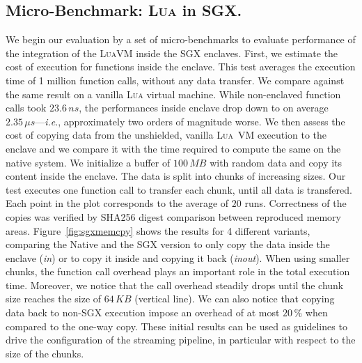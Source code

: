 \subsection{Micro-Benchmark: \textsc{Lua} in SGX.}
We begin our evaluation by a set of micro-benchmarks to evaluate performance of the integration of the \textsc{LuaVM} inside the SGX enclaves.
First, we estimate the cost of execution for functions inside the enclave.
This test averages the execution time of 1 million function calls, without any data transfer.
We compare against the same result on a vanilla \textsc{Lua} virtual machine.
While non-enclaved function calls took $23.6\,ns$, the performances inside enclave drop down to on average $2.35\,\mu{}s$---\textit{i.e}., approximately two orders of magnitude worse.
We then assess the cost of copying data from the unshielded, vanilla \textsc{Lua}~VM execution to the enclave and we compare it with the time required to compute the same on the native system.
We initialize a buffer of $100\,MB$ with random data and copy its content inside the enclave. 
The data is split into chunks of increasing sizes.
Our test executes one function call to transfer each chunk, until all data is transfered.
Each point in the plot corresponds to the average of $20$ runs. 
Correctness of the copies was verified by \textsf{SHA256} digest comparison between reproduced memory areas.
Figure~\ref{fig:sgxmemcpy} shows the results for 4 different variants, comparing the Native and the SGX version to only copy the data inside the enclave (\emph{in}) or to copy it inside and copying it back (\emph{in\/out}).
When using smaller chunks, the function call overhead plays an important role in the total execution time.
Moreover, we notice that the call overhead steadily drops until the chunk size reaches the size of $64\,KB$ (vertical line).
We can also notice that copying data back to non-SGX execution impose an overhead of at most $20\,\%$ when compared to the one-way copy.
These initial results can be used as guidelines to drive the configuration of the streaming pipeline, in particular with respect to the size of the chunks. %

